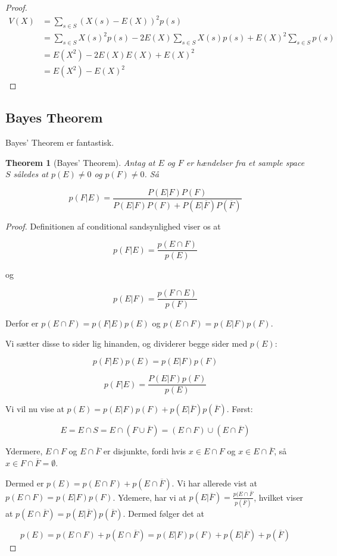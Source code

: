\documentclass[11pt]{article}
\newtheorem{theorem}{Theorem}
\theoremstyle{definition}
\theoremstyle{remark}
\begin{document}
\begin{proof}
\begin{equation}
  \label{}
\begin{split}
  V(X) &= \sum_{s \in S}^{}(X(s) - E(X))^{2}p(s)\\
       &= \sum_{s \in S}^{} X(s)^{2}p(s) - 2E(X) \sum_{s \in S}^{} X(s)p(s) + E(X)^{2} \sum_{s \in S}^{}p(s)\\
       &= E(X^{2}) - 2E(X)E(X) + E(X)^{2}\\
  &= E(X^{2}) - E(X)^{2}
\end{split}
\end{equation}

\end{proof}

\subsection{Bayes Theorem}
\label{subsec:label}

Bayes' Theorem er fantastisk.

\begin{theorem}[Bayes' Theorem]
  Antag at $E$ og $F$ er hændelser fra et sample space $S$ således at $p(E) \neq 0$ og $p(F) \neq 0$. Så

  \[
p(F|E) = \frac{P(E|F)P(F)}{P(E|F)P(F)+P(E|\overline{F})P(\overline{F})}
  \]
\end{theorem}

\begin{proof}
  Definitionen af conditional sandsynlighed viser os at

  \[
p(F|E) = \frac{p(E \cap F)}{p(E)}
  \]

  og

  \[
p(E|F) = \frac{p(F \cap E)}{p(F)}
  \]

  Derfor er $p(E \cap F) = p(F|E)p(E)$ og $p(E \cap F) = p(E|F)p(F)$.

  Vi sætter disse to sider lig hinanden, og dividerer begge sider med $p(E)$:

  \[
p(F|E)p(E) = p(E|F)p(F)
  \]

  \[
p(F|E) = \frac{P(E|F)p(F)}{p(E)}
  \]

  Vi vil nu vise at $p(E) = p(E|F)p(F) + p(E|\overline{F}) p(\overline{F})$.
  Først:

  \[
E = E \cap S = E \cap (F \cup \overline{F}) = (E \cap F) \cup (E \cap \overline{F})
  \]

  Ydermere, $E \cap F$ og $E \cap \overline{F}$ er disjunkte, fordi hvis $x \in E \cap F$ og $x \in E \cap \overline{F}$, så $x \in F \cap \overline{F} = \emptyset$.

  Dermed er $p(E) = p(E \cap F) + p(E \cap \overline{F})$. Vi har allerede vist at $p(E \cap F) = p(E|F) p(F)$. Ydemere, har vi at $p(E|\overline{F}) = \frac{p(E \cap \overline{F}}{p(\overline{F})}$, hvilket viser at $p(E \cap \overline{F}) = p(E|\overline{F}) p(\overline{F})$. Dermed følger det at

  \[
p(E) = p(E \cap F) + p(E \cap \overline{F}) = p(E|F) p(F) + p(E|\overline{F}) + p(\overline{F})
  \]
  
\end{proof}
\end{document}
